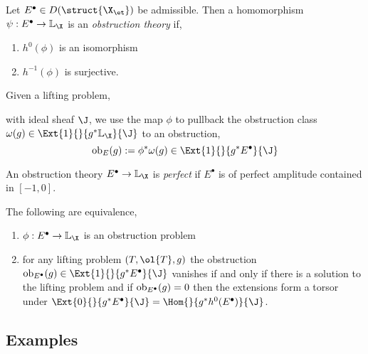 \documentclass[12pt]{article}
\begin{document}
\begin{defn}
Let $E^\bullet \in D(\struct{\X_\et})$ be admissible. Then a homomorphism $\psi : E^\bullet \to \LL_{\X}$ is an \textit{obstruction theory} if,
\begin{enumerate}
\item $h^0(\phi)$ is an isomorphism
\item $h^{-1}(\phi)$ is surjective.
\end{enumerate}
\end{defn}

\begin{rmk}
Given a lifting problem,
\begin{center}
\end{center}
with ideal sheaf $\J$, we use the map $\phi$ to pullback the obstruction class $\omega(g) \in \Ext{1}{}{g^* \LL_{\X}}{\J}$ to an obstruction,
\[ \ob_{E}(g) := \phi^* \omega(g) \in \Ext{1}{}{g^* E^\bullet}{\J} \]
\end{rmk}


\begin{defn}
An obstruction theory $E^\bullet \to \LL_{\X}$ is \textit{perfect} if $E^\bullet$ is of perfect amplitude contained in $[-1,0]$.
\end{defn}

\begin{theorem}
The following are equivalence,
\begin{enumerate}
\item $\phi : E^\bullet \to \LL_{\X}$ is an obstruction problem

\item for any lifting problem $(T, \ol{T}, g)$ the obstruction $\ob_{E^\bullet}(g) \in \Ext{1}{}{g^* E^\bullet}{\J}$ vanishes if and only if there is a solution to the lifting problem and if $\mathrm{ob}_{E^\bullet}(g) = 0$ then the extensions form a torsor under $\Ext{0}{}{g^* E^\bullet}{\J} = \Hom{}{g^* h^0(E^\bullet)}{\J}$.
\end{enumerate}
\end{theorem}

\subsection{Examples}

\newcommand{\R}{\mathbf{R}}
\end{document}
